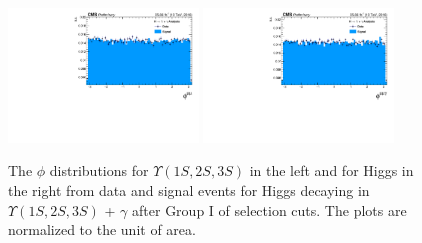\begin{figure}[!htbp]
\begin{center}
\includegraphics[width=0.45\textwidth]{figures_and_tables/outputPlots/HtoUpsilon_Cat0_ZZZZZ/au/data_x_mc/noKinCuts/h_noKin_Upsilon_phi}\hspace*{1.cm}
\includegraphics[width=0.45\textwidth]{figures_and_tables/outputPlots/HtoUpsilon_Cat0_ZZZZZ/au/data_x_mc/noKinCuts/h_noKin_Z_phi}
\end{center}\vspace*{-.5cm}
\caption{The $\phi$ distributions for $\Upsilon(1S,2S,3S)$ in the left and for Higgs in the right from data and signal events for Higgs decaying in $\Upsilon(1S,2S,3S)$ + $\gamma$ after Group I of selection cuts. The plots are normalized to the unit of area.}
\label{fig:phiUpsilon_and_Higgs_HtoUpsilon_Cat0}
\end{figure}


